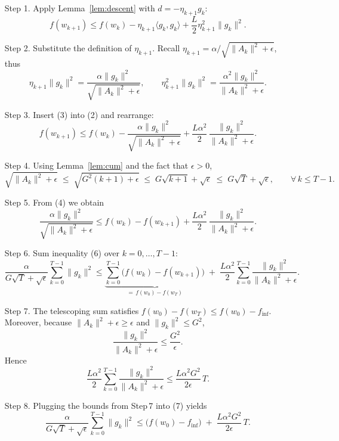 \documentclass{article}
\begin{document}
\begin{enumerate}
\item[Step 1.] Apply Lemma~\ref{lem:descent} with $d=-\eta_{k+1}g_k$:
\[
f(w_{k+1})\le f(w_k)-\eta_{k+1}\langle g_k,g_k\rangle
+\frac{L}{2}\eta_{k+1}^{2}\|g_k\|^{2}.
\tag{2}
\]

\item[Step 2.] Substitute the definition of $\eta_{k+1}$.
Recall $\eta_{k+1}= \alpha/ \sqrt{\|A_k\|^{2}+\epsilon}$, thus
\[
\eta_{k+1}\|g_k\|^{2}
= \frac{\alpha\|g_k\|^{2}}{\sqrt{\|A_k\|^{2}+\epsilon}},
\qquad
\eta_{k+1}^{2}\|g_k\|^{2}
= \frac{\alpha^{2}\|g_k\|^{2}}{\|A_k\|^{2}+\epsilon}.
\tag{3}
\]

\item[Step 3.] Insert (3) into (2) and rearrange:
\[
f(w_{k+1})\le f(w_k)-\frac{\alpha\|g_k\|^{2}}
{\sqrt{\|A_k\|^{2}+\epsilon}}
+\frac{L\alpha^{2}}{2}\,
\frac{\|g_k\|^{2}}{\|A_k\|^{2}+\epsilon}.
\tag{4}
\]

\item[Step 4.] %
Using Lemma~\ref{lem:cum} and the fact that $\epsilon>0$,
\[
\sqrt{\|A_k\|^{2}+\epsilon}
\;\le\; \sqrt{G^{2}(k+1)+\epsilon}
\;\le\; G\sqrt{k+1}+\sqrt{\epsilon}
\;\le\; G\sqrt{T}+\sqrt{\epsilon},
\qquad\forall\,k\le T-1.
\tag{5}
\]

\item[Step 5.] From (4) we obtain
\[
\frac{\alpha\|g_k\|^{2}}{\sqrt{\|A_k\|^{2}+\epsilon}}
\le
f(w_k)-f(w_{k+1})
+\frac{L\alpha^{2}}{2}\,
\frac{\|g_k\|^{2}}{\|A_k\|^{2}+\epsilon}.
\tag{6}
\]

\item[Step 6.] Sum inequality (6) over $k=0,\dots,T-1$:
\[
\frac{\alpha}{G\sqrt{T}+\sqrt{\epsilon}}
\sum_{k=0}^{T-1}\|g_k\|^{2}
\le
\underbrace{\sum_{k=0}^{T-1}\bigl(f(w_k)-f(w_{k+1})\bigr)}_{=\,f(w_0)-f(w_T)}
\;+\;
\frac{L\alpha^{2}}{2}\sum_{k=0}^{T-1}
\frac{\|g_k\|^{2}}{\|A_k\|^{2}+\epsilon}.
\tag{7}
\]

\item[Step 7.] The telescoping sum satisfies
$f(w_0)-f(w_T)\le f(w_0)-f_{\inf}$.
Moreover, because $\|A_k\|^{2}+\epsilon\ge\epsilon$ and $\|g_k\|^{2}\le G^{2}$,
\[
\frac{\|g_k\|^{2}}{\|A_k\|^{2}+\epsilon}
\le \frac{G^{2}}{\epsilon}.
\]
Hence
\[
\frac{L\alpha^{2}}{2}\sum_{k=0}^{T-1}
\frac{\|g_k\|^{2}}{\|A_k\|^{2}+\epsilon}
\le
\frac{L\alpha^{2}G^{2}}{2\epsilon}\,T.
\tag{8}
\]

\item[Step 8.] Plugging the bounds from Step 7 into (7) yields
\[
\frac{\alpha}{G\sqrt{T}+\sqrt{\epsilon}}
\sum_{k=0}^{T-1}\|g_k\|^{2}
\le
\bigl(f(w_0)-f_{\inf}\bigr)
\;+\;
\frac{L\alpha^{2}G^{2}}{2\epsilon}\,T .
\tag{9}
\]


\end{enumerate}
\end{document}
